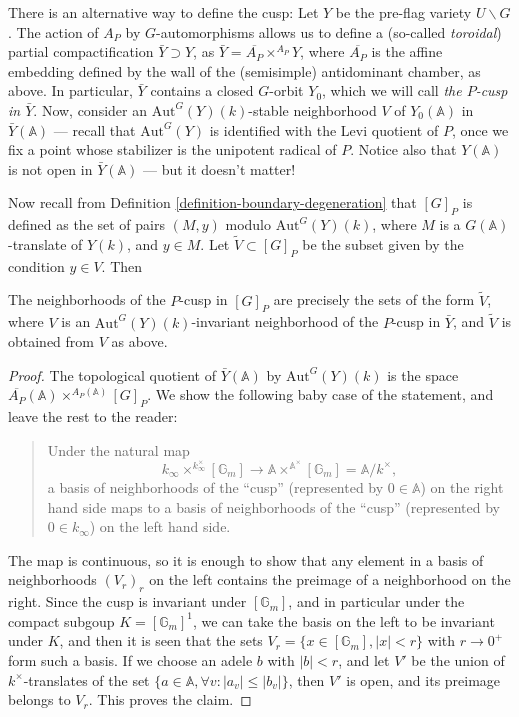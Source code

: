 There is an alternative way to define the cusp: Let $Y$ be the pre-flag variety $U\backslash G$. The action of $A_P$ by $G$-automorphisms allows us to define a (so-called \emph{toroidal}) partial compactification $\bar Y\supset Y$, as $\bar Y = \overline{A_P} \times^{A_P} Y$, where $\overline{A_P}$ is the affine embedding defined by the wall of the (semisimple) antidominant chamber, as above. In particular, $\bar Y$ contains a closed $G$-orbit $Y_0$, which we will call \emph{the $P$-cusp in $\bar Y$}. Now, consider an $\text{Aut}^G(Y)(k)$-stable neighborhood $V$ of $Y_0(\mathbb A)$ in $\bar Y(\mathbb A)$ --- recall that $\text{Aut}^G(Y)$ is identified with the Levi quotient of $P$, once we fix a point whose stabilizer is the unipotent radical of $P$. Notice also that $Y(\mathbb A)$ is not open in $\bar Y(\mathbb A)$ --- but it doesn't matter! 

Now recall from Definition \ref{definition-boundary-degeneration} that $[G]_P$ is defined as the set of pairs $(M,y)$ modulo $\text{Aut}^G(Y)(k)$, where $M$ is a $G(\mathbb A)$-translate of $Y(k)$, and $y\in M$. Let $\tilde V\subset [G]_P$ be the subset given by the condition $y\in V$. Then

\begin{lemma}
 \label{lemma-cusp-alternative-definition}
The neighborhoods of the $P$-cusp in $[G]_P$ are precisely the sets of the form $\tilde V$, where $V$ is an $\text{Aut}^G(Y)(k)$-invariant neighborhood of the $P$-cusp in $\bar Y$, and $\tilde V$ is obtained from $V$ as above.
\end{lemma}

\begin{proof}
The topological quotient of $\bar Y(\mathbb A)$ by $\text{Aut}^G(Y)(k)$ is the space $\overline{A_P}(\mathbb A) \times^{A_P(\mathbb A)} [G]_P$. We show the following baby case of the statement, and leave the rest to the reader:

\begin{quote}
Under the natural map 
$$ k_\infty \times^{k_\infty^\times} [\mathbb G_m] \to \mathbb A \times^{\mathbb A^\times} [\mathbb G_m] = \mathbb A/k^\times,$$
a basis of neighborhoods of the ``cusp'' (represented by $0\in \mathbb A$) on the right hand side maps to a basis of neighborhoods of the ``cusp'' (represented by $0\in k_\infty$) on the left hand side.
\end{quote}

The map is continuous, so it is enough to show that any element in a basis of neighborhoods $(V_r)_r$ on the left contains the preimage of a neighborhood on the right. Since the cusp is invariant under $[\mathbb G_m]$, and in particular under the compact subgoup $K=[\mathbb G_m]^1$, we can take the basis on the left to be invariant under $K$, and then it is seen that the sets $V_r = \{ x\in [\mathbb G_m], |x|<r\}$  with $r\to 0^+$ form such a basis. If we choose an adele $b$ with $|b|<r$, and let $V'$ be the union of $k^\times$-translates of the set $\{a \in \mathbb A, \forall v:  |a_v|\le |b_v|\}$, then $V'$ is open, and its preimage belongs to $V_r$. This proves the claim. 

\end{proof}

